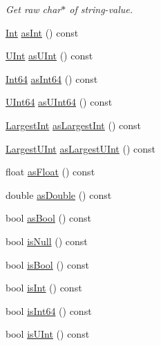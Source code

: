 \begin{DoxyCompactItemize}
\begin{DoxyCompactList}\small\item\em Get raw char$\ast$ of string-\/value. \end{DoxyCompactList}\item 
\hyperlink{classJson_1_1Value_abdf7a7ff73eb130ffcab28504ffdb405}{Int} \hyperlink{classJson_1_1Value_ac786e35b860b1d700cb3d3e56dd6a235}{as\+Int} () const 
\item 
\hyperlink{classJson_1_1Value_a0933d59b45793ae4aade1757c322a98d}{U\+Int} \hyperlink{classJson_1_1Value_a2019d1bd296b89356c1b0da5970c918c}{as\+U\+Int} () const 
\item 
\hyperlink{classJson_1_1Value_a1b86af9f85f0f1baa972c3319fa22695}{Int64} \hyperlink{classJson_1_1Value_a4451cee7524534458894f4e2cc045aa3}{as\+Int64} () const 
\item 
\hyperlink{classJson_1_1Value_a8b62564be8c087c6d18de180ff4e13e3}{U\+Int64} \hyperlink{classJson_1_1Value_a4aa617bc0625ae0f208fa54b7c6326ad}{as\+U\+Int64} () const 
\item 
\hyperlink{classJson_1_1Value_a1cbb82642ed05109b9833e49f042ece7}{Largest\+Int} \hyperlink{classJson_1_1Value_a3786bb100c5cf9a98eb6d13784968956}{as\+Largest\+Int} () const 
\item 
\hyperlink{classJson_1_1Value_a6682a3684d635e03fc06ba229fa24eec}{Largest\+U\+Int} \hyperlink{classJson_1_1Value_a692b88345a745b2f89ca5d94b52e94d4}{as\+Largest\+U\+Int} () const 
\item 
float \hyperlink{classJson_1_1Value_ac2128d7080499daf8c5b1c71da243f63}{as\+Float} () const 
\item 
double \hyperlink{classJson_1_1Value_a33434ed1c0217a34d04c95fa5342fd37}{as\+Double} () const 
\item 
bool \hyperlink{classJson_1_1Value_a7402c797285c020566c3db5f8ae4e940}{as\+Bool} () const 
\item 
bool \hyperlink{classJson_1_1Value_aeb9ad8b1bb91bdd72203dc884b3f4362}{is\+Null} () const 
\item 
bool \hyperlink{classJson_1_1Value_a3c3716cc7a0216cb1b654bb8f61c8d13}{is\+Bool} () const 
\item 
bool \hyperlink{classJson_1_1Value_ab0df4746d6787d2ce1db1a156c118f14}{is\+Int} () const 
\item 
bool \hyperlink{classJson_1_1Value_aba89690e5fd72d0f7121a30013470423}{is\+Int64} () const 
\item 
bool \hyperlink{classJson_1_1Value_ae814ca1796fe2d43ac09898b70213989}{is\+U\+Int} () const 
\item 

\end{DoxyCompactItemize}
